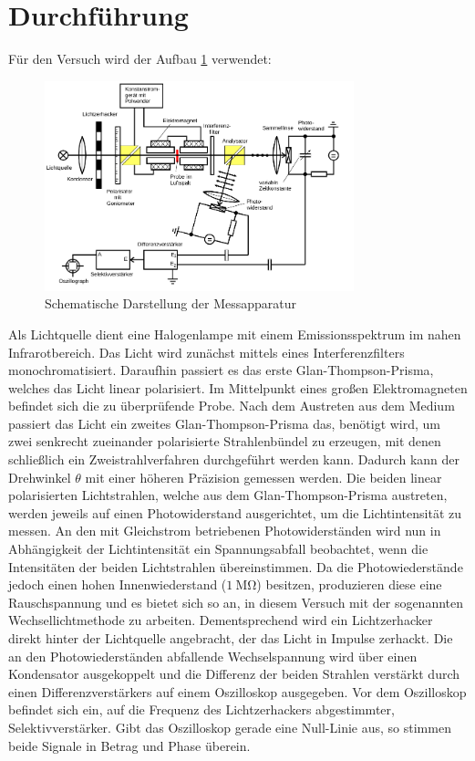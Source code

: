 \section{Durchführung}
\label{sec:Durchführung}

Für den Versuch wird der Aufbau \ref{fig:Bild2} verwendet:
\begin{figure}
	\centering
	\includegraphics[width=0.8\textwidth]{pictures/aufbau.png}
	\caption{Schematische Darstellung der Messapparatur \cite{Anleitung}}
	\label{fig:Bild2}
\end{figure}
Als Lichtquelle dient eine Halogenlampe mit einem Emissionsspektrum im nahen Infrarotbereich.
Das Licht wird zunächst mittels eines Interferenzfilters monochromatisiert.
Daraufhin passiert es das erste Glan-Thompson-Prisma, welches das Licht linear polarisiert.
Im Mittelpunkt eines großen Elektromagneten befindet sich die zu überprüfende Probe.
Nach dem Austreten aus dem Medium passiert das Licht ein zweites Glan-Thompson-Prisma das,
benötigt wird, um zwei senkrecht zueinander polarisierte Strahlenbündel zu erzeugen, mit denen
schließlich ein Zweistrahlverfahren durchgeführt werden kann. Dadurch kann der Drehwinkel $\theta$ mit einer höheren Präzision gemessen werden. Die beiden linear polarisierten Lichtstrahlen, welche aus dem
Glan-Thompson-Prisma austreten, werden jeweils auf einen Photowiderstand ausgerichtet, um die
Lichtintensität zu messen. An den mit Gleichstrom betriebenen Photowiderständen wird nun in
Abhängigkeit der Lichtintensität ein Spannungsabfall beobachtet, wenn die Intensitäten der beiden Lichtstrahlen übereinstimmen. Da die Photowiederstände jedoch
einen hohen Innenwiederstand ($\SI{1}{\mega\ohm}$) besitzen, produzieren diese eine
Rauschspannung und es bietet sich so an, in diesem Versuch mit der sogenannten
Wechsellichtmethode zu arbeiten. Dementsprechend wird ein Lichtzerhacker direkt hinter der
Lichtquelle angebracht, der das Licht in Impulse zerhackt. Die an den Photowiederständen
abfallende Wechselspannung wird über einen Kondensator ausgekoppelt und die Differenz der
beiden Strahlen verstärkt durch einen Differenzverstärkers auf einem Oszilloskop
ausgegeben. Vor dem Oszilloskop befindet sich ein, auf die Frequenz des Lichtzerhackers abgestimmter,
Selektivverstärker. Gibt das Oszilloskop gerade eine Null-Linie aus, so stimmen beide Signale in Betrag und Phase überein.

